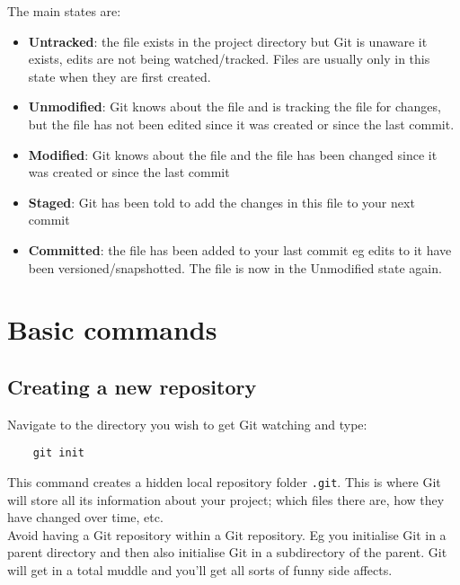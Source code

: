 The main states are:

\begin{itemize}
	\item \textbf{Untracked}: the file exists in the project directory but Git is unaware it exists, edits are not being watched/tracked. Files are usually only in this state when they are first created.
    \item \textbf{Unmodified}: Git knows about the file and is tracking the file for changes, but the file has not been edited since it was created or since the last commit.
    \item \textbf{Modified}: Git knows about the file and the file has been changed since it was created or since the last commit
    \item \textbf{Staged}: Git has been told to add the changes in this file to your next commit
    \item \textbf{Committed}: the file has been added to your last commit eg edits to it have been versioned/snapshotted. The file is now in the Unmodified state again.
\end{itemize}



\section{Basic commands}

\subsection{Creating a new repository}

Navigate to the directory you wish to get Git watching and type:

\begin{verbatim}
    git init
\end{verbatim}

This command creates a hidden local repository folder \texttt{.git}. This is where Git will store all its information about your project; which files there are, how they have changed over time, etc.
\\

Avoid having a Git repository within a Git repository. Eg you initialise Git in a parent directory and then also initialise Git in a subdirectory of the parent. Git will get in a total muddle and you'll get all sorts of funny side affects. 
\\

